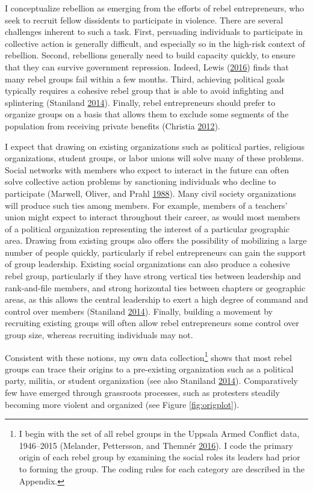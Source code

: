 \documentclass[12pt,]{book}
\let\rmarkdownfootnote\footnote%
\def\footnote{\protect\rmarkdownfootnote}
\theoremstyle{definition}
\theoremstyle{definition}
\theoremstyle{definition}
\theoremstyle{remark}
\begin{document}
I conceptualize rebellion as emerging from the efforts of rebel
entrepreneurs, who seek to recruit fellow dissidents to participate in
violence. There are several challenges inherent to such a task. First,
persuading individuals to participate in collective action is generally
difficult, and especially so in the high-risk context of rebellion.
Second, rebellions generally need to build capacity quickly, to ensure
that they can survive government repression. Indeed, Lewis
(\protect\hyperlink{ref-Lewis2016}{2016}) finds that many rebel groups
fail within a few months. Third, achieving political goals typically
requires a cohesive rebel group that is able to avoid infighting and
splintering (Staniland \protect\hyperlink{ref-Staniland2014}{2014}).
Finally, rebel entrepreneurs should prefer to organize groups on a basis
that allows them to exclude some segments of the population from
receiving private benefits (Christia
\protect\hyperlink{ref-Christia2012}{2012}).

I expect that drawing on existing organizations such as political
parties, religious organizations, student groups, or labor unions will
solve many of these problems. Social networks with members who expect to
interact in the future can often solve collective action problems by
sanctioning individuals who decline to participate (Marwell, Oliver, and
Prahl \protect\hyperlink{ref-Marwell1988}{1988}). Many civil society
organizations will produce such ties among members. For example, members
of a teachers' union might expect to interact throughout their career,
as would most members of a political organization representing the
interest of a particular geographic area. Drawing from existing groups
also offers the possibility of mobilizing a large number of people
quickly, particularly if rebel entrepreneurs can gain the support of
group leadership. Existing social organizations can also produce a
cohesive rebel group, particularly if they have strong vertical ties
between leadership and rank-and-file members, and strong horizontal ties
between chapters or geographic areas, as this allows the central
leadership to exert a high degree of command and control over members
(Staniland \protect\hyperlink{ref-Staniland2014}{2014}). Finally,
building a movement by recruiting existing groups will often allow rebel
entrepreneurs some control over group size, whereas recruiting
individuals may not.

Consistent with these notions, my own data collection\footnote{I begin
  with the set of all rebel groups in the Uppsala Armed Conflict data,
  1946--2015 (Melander, Pettersson, and Themnér
  \protect\hyperlink{ref-Melander2016}{2016}). I code the primary origin
  of each rebel group by examining the social roles its leaders had
  prior to forming the group. The coding rules for each category are
  described in the Appendix.} shows that most rebel groups can trace
their origins to a pre-existing organization such as a political party,
militia, or student organization (see also Staniland
\protect\hyperlink{ref-Staniland2014}{2014}). Comparatively few have
emerged through grassroots processes, such as protesters steadily
becoming more violent and organized (see Figure \ref{fig:origplot}).
\end{document}
